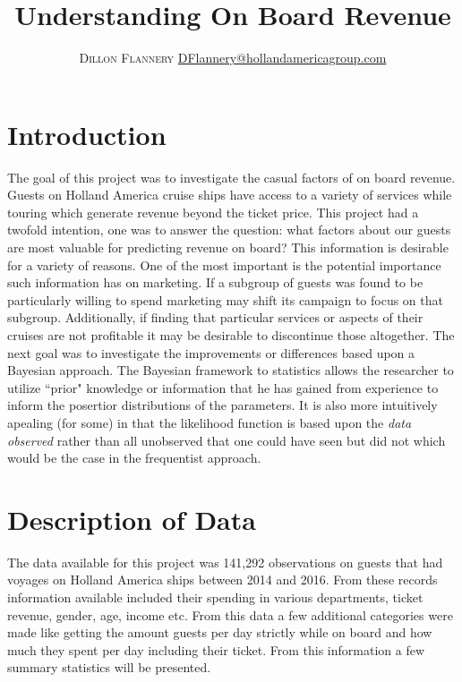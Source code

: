 \documentclass[twoside,twocolumn]{article}
\title{Understanding On Board Revenue} %
\author{%
\textsc{Dillon Flannery}
\normalsize \href{mailto:DFlannery@hollandamericagroup.com}{DFlannery@hollandamericagroup.com}
}
\begin{document}
\maketitle
\section{Introduction}
The goal of this project was to investigate the casual factors of on board revenue. Guests on Holland America cruise ships have access to a variety of services while touring which generate revenue beyond the ticket price. This project had a twofold intention, one was to answer the question: what factors about our guests are most valuable for predicting revenue on board? This information is desirable for a variety of reasons. One of the most important is the potential importance such information has on marketing. If a subgroup of guests was found to be particularly willing to spend marketing may shift its campaign to focus on that subgroup. Additionally, if finding that particular services or aspects of their cruises are not profitable it may be desirable to discontinue those altogether. The next goal was to investigate the improvements or differences based upon a Bayesian approach. The Bayesian framework to statistics allows the researcher to utilize ``prior" knowledge or information that he has gained from experience to inform the posertior distributions of the parameters. It is also more intuitively apealing (for some) in that the likelihood function is based upon the \textit{data observed} rather than all unobserved that one could have seen but did not which would be the case in the frequentist approach. 

\section{Description of Data}
The data available for this project was 141,292 observations on guests that had voyages on Holland America ships between 2014 and 2016. From these records information available included their spending in various departments, ticket revenue, gender, age, income etc. From this data a few additional categories were made like getting the amount guests per day strictly while on board and how much they spent per day including their ticket. From this information a few summary statistics will be presented. \\
\end{document}
